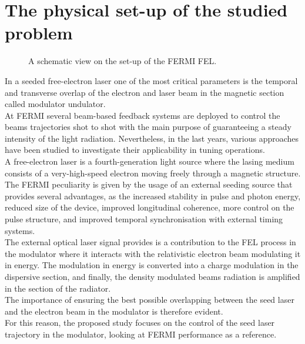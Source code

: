 \documentclass[
reprint,
amsmath,amssymb,amsfonts,clevref,
aps,
prstab,
]{revtex4-2}
\begin{document}
	
	
	\section{The physical set-up of the studied problem}
	\begin{figure}[!h]
		\centering
		
		\caption{A schematic view on the set-up of the FERMI FEL.}
		\label{fig:schematic_FEL}
	\end{figure}
	In a seeded free-electron laser one of the most critical parameters is the temporal and transverse overlap of the electron and laser beam in the magnetic section called modulator undulator.\\
	At FERMI several beam-based feedback systems are deployed to control the beams trajectories shot to shot with the main purpose of guaranteeing a steady intensity of the light radiation. Nevertheless, in the last years, various approaches have been studied to investigate their applicability in tuning operations. \\
	A free-electron laser is a fourth-generation light source where the lasing medium consists of a very-high-speed electron moving freely through a magnetic structure. The FERMI peculiarity is given by the usage of an external seeding source that provides several advantages, as the increased stability in pulse and photon energy, reduced size of the device, improved longitudinal coherence, more control on the pulse structure, and improved temporal synchronisation with external timing systems.\\
	The external optical laser signal provides is a contribution to the FEL process in the modulator where it interacts with the relativistic electron beam modulating it in energy. The modulation in energy is converted into a charge modulation in the dispersive section, and finally, the density modulated beams radiation is amplified in the section of the radiator.\\
	 The importance of ensuring the best possible overlapping between the seed laser and the electron beam in the modulator is therefore evident.\\
	For this reason, the proposed study focuses on the control of the seed laser trajectory in the modulator, looking at FERMI performance as a reference.
	
\end{document}
